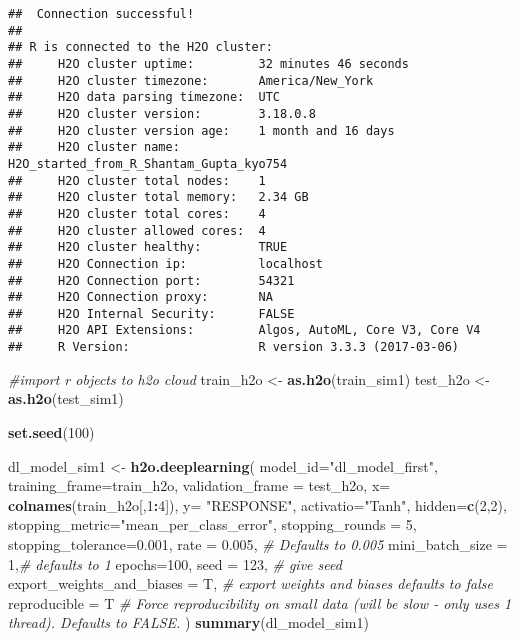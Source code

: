 \documentclass[]{article}
\newenvironment{Shaded}{\begin{snugshade}}{\end{snugshade}}
\newcommand{\KeywordTok}[1]{\textcolor[rgb]{0.13,0.29,0.53}{\textbf{#1}}}
\newcommand{\DataTypeTok}[1]{\textcolor[rgb]{0.13,0.29,0.53}{#1}}
\newcommand{\DecValTok}[1]{\textcolor[rgb]{0.00,0.00,0.81}{#1}}
\newcommand{\FloatTok}[1]{\textcolor[rgb]{0.00,0.00,0.81}{#1}}
\newcommand{\StringTok}[1]{\textcolor[rgb]{0.31,0.60,0.02}{#1}}
\newcommand{\CommentTok}[1]{\textcolor[rgb]{0.56,0.35,0.01}{\textit{#1}}}
\newcommand{\OperatorTok}[1]{\textcolor[rgb]{0.81,0.36,0.00}{\textbf{#1}}}
\newcommand{\NormalTok}[1]{#1}
\begin{document}
\begin{verbatim}
##  Connection successful!
## 
## R is connected to the H2O cluster: 
##     H2O cluster uptime:         32 minutes 46 seconds 
##     H2O cluster timezone:       America/New_York 
##     H2O data parsing timezone:  UTC 
##     H2O cluster version:        3.18.0.8 
##     H2O cluster version age:    1 month and 16 days  
##     H2O cluster name:           H2O_started_from_R_Shantam_Gupta_kyo754 
##     H2O cluster total nodes:    1 
##     H2O cluster total memory:   2.34 GB 
##     H2O cluster total cores:    4 
##     H2O cluster allowed cores:  4 
##     H2O cluster healthy:        TRUE 
##     H2O Connection ip:          localhost 
##     H2O Connection port:        54321 
##     H2O Connection proxy:       NA 
##     H2O Internal Security:      FALSE 
##     H2O API Extensions:         Algos, AutoML, Core V3, Core V4 
##     R Version:                  R version 3.3.3 (2017-03-06)
\end{verbatim}

\begin{Shaded}
\begin{Highlighting}[]
\CommentTok{#import r objects to h2o cloud}
\NormalTok{train_h2o <-}\StringTok{ }\KeywordTok{as.h2o}\NormalTok{(train_sim1)}
\NormalTok{test_h2o <-}\StringTok{ }\KeywordTok{as.h2o}\NormalTok{(test_sim1)}

\KeywordTok{set.seed}\NormalTok{(}\DecValTok{100}\NormalTok{)}

\NormalTok{dl_model_sim1 <-}\StringTok{ }\KeywordTok{h2o.deeplearning}\NormalTok{(}
  \DataTypeTok{model_id=}\StringTok{"dl_model_first"}\NormalTok{, }
  \DataTypeTok{training_frame=}\NormalTok{train_h2o, }
  \DataTypeTok{validation_frame =}\NormalTok{ test_h2o,}
  \DataTypeTok{x=} \KeywordTok{colnames}\NormalTok{(train_h2o[,}\DecValTok{1}\OperatorTok{:}\DecValTok{4}\NormalTok{]),}
  \DataTypeTok{y=} \StringTok{"RESPONSE"}\NormalTok{,}
  \DataTypeTok{activatio=}\StringTok{"Tanh"}\NormalTok{,  }
  \DataTypeTok{hidden=}\KeywordTok{c}\NormalTok{(}\DecValTok{2}\NormalTok{,}\DecValTok{2}\NormalTok{), }
  \DataTypeTok{stopping_metric=}\StringTok{"mean_per_class_error"}\NormalTok{,}
  \DataTypeTok{stopping_rounds =} \DecValTok{5}\NormalTok{,}
  \DataTypeTok{stopping_tolerance=}\FloatTok{0.001}\NormalTok{,}
  \DataTypeTok{rate =} \FloatTok{0.005}\NormalTok{, }\CommentTok{# Defaults to 0.005}
  \DataTypeTok{mini_batch_size =} \DecValTok{1}\NormalTok{,}\CommentTok{# defaults to 1 }
  \DataTypeTok{epochs=}\DecValTok{100}\NormalTok{,}
  \DataTypeTok{seed =} \DecValTok{123}\NormalTok{, }\CommentTok{# give seed }
  \DataTypeTok{export_weights_and_biases =}\NormalTok{ T, }\CommentTok{# export weights and biases defaults to false}
  \DataTypeTok{reproducible =}\NormalTok{ T }\CommentTok{# Force reproducibility on small data (will be slow - only uses 1 thread). Defaults to FALSE.}
\NormalTok{)}
\KeywordTok{summary}\NormalTok{(dl_model_sim1)}
\end{Highlighting}
\end{Shaded}
\end{document}
